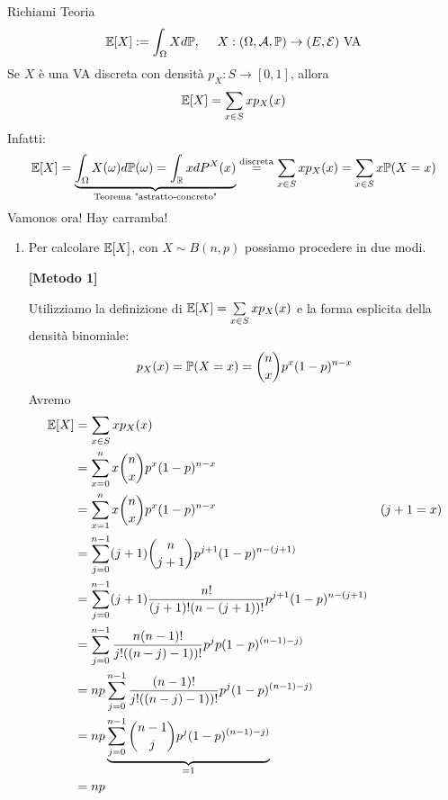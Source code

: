 Richiami Teoria
\begin{equation*}
\mathbb{E}[ X] :=\int _{\Omega } Xd\mathbb{P} ,\ \ \ \ X:( \Omega ,\mathcal{A} ,\mathbb{P})\rightarrow ( E,\mathcal{E}) \ \text{VA}
\end{equation*}
Se $X$ è una VA discreta con densità $p_{X} :S\rightarrow [ 0,1]$, allora
\begin{equation*}
\mathbb{E}[ X] =\sum\limits _{x\in S} xp_{X}( x)
\end{equation*}
Infatti:
\begin{equation*}
\mathbb{E}[ X] =\underbrace{\int _{\Omega } X( \omega ) d\mathbb{P}( \omega ) =\int _{\mathbb{R}} xdP^{X}( x)}_{\text{Teorema "astratto-concreto"}}\overset{\text{discreta}}{=}\sum\limits _{x\in S} xp_{X}( x) =\sum\limits _{x\in S} x\mathbb{P}( X=x)
\end{equation*}
Vamonos ora! Hay carramba!
\begin{enumerate}
\item Per calcolare $\mathbb{E}[ X]$, con $X\sim B( n,p)$ possiamo procedere in due modi.

\textbf{[Metodo 1]}

Utilizziamo la definizione di $\mathbb{E}[ X] =\sum\limits _{x\in S} xp_{X}( x)$ e la forma esplicita della densità binomiale:\begin{equation*}
p_{X}( x) =\mathbb{P}( X=x) =\binom{n}{x} p^{x}( 1-p)^{n-x}
\end{equation*}Avremo\begin{equation*}
\begin{aligned}
\mathbb{E}[ X] & =\sum\limits _{x\in S} xp_{X}( x) & \\
 & =\sum\limits _{x=0}^{n} x\binom{n}{x} p^{x}( 1-p)^{n-x} & \\
 & =\sum\limits _{x=1}^{n} x\binom{n}{x} p^{x}( 1-p)^{n-x} & ( j+1=x)\\
 & =\sum\limits _{j=0}^{n-1}( j+1)\binom{n}{j+1} p^{j+1}( 1-p)^{n-( j+1)} & \\
 & =\sum\limits _{j=0}^{n-1}( j+1)\frac{n!}{( j+1) !( n-( j+1)) !} p^{j+1}( 1-p)^{n-( j+1)} & \\
 & =\sum\limits _{j=0}^{n-1}\frac{n( n-1) !}{j!(( n-j) -1)) !} p^{j} p( 1-p)^{( n-1) -j)} & \\
 & =np\sum\limits _{j=0}^{n-1}\frac{( n-1) !}{j!(( n-j) -1)) !} p^{j}( 1-p)^{( n-1) -j)} & \\
 & =np\underbrace{\sum\limits _{j=0}^{n-1}\binom{n-1}{j} p^{j}( 1-p)^{( n-1) -j)}}_{=1} & \\
 & =np & 
\end{aligned}
\end{equation*}


\end{enumerate}
